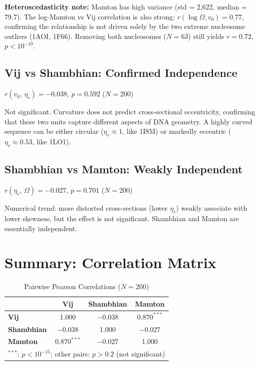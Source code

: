 \textbf{Heteroscedasticity note:} Mamton has high variance (std = 2,622, median = 79.7). The log-Mamton vs Vij correlation is also strong: $r(\log\Omega, v_0) = 0.77$, confirming the relationship is not driven solely by the two extreme nucleosome outliers (1AOI, 1F66). Removing both nucleosomes ($N=63$) still yields $r = 0.72$, $p < 10^{-10}$.

\subsection{Vij vs Shambhian: Confirmed Independence}

\begin{keyresult}
    $r(v_0,\,\eta_r) = -0.038$, \quad $p = 0.592$ \quad ($N=200$)
\end{keyresult}

Not significant. Curvature does not predict cross-sectional eccentricity, confirming that these two units capture different aspects of DNA geometry. A highly curved sequence can be either circular ($\eta_r \approx 1$, like 1I8M) or markedly eccentric ($\eta_r \approx 0.53$, like 1LO1).

\subsection{Shambhian vs Mamton: Weakly Independent}

\begin{keyresult}
    $r(\eta_r,\,\Omega) = -0.027$, \quad $p = 0.701$ \quad ($N=200$)
\end{keyresult}

Numerical trend: more distorted cross-sections (lower $\eta_r$) weakly associate with lower skewness, but the effect is not significant. Shambhian and Mamton are essentially independent.

\section{Summary: Correlation Matrix}

\begin{table}[h]
    \centering
    \caption{Pairwise Pearson Correlations ($N=200$)}
    \begin{tabular}{lccc}
        \toprule
         & \textbf{Vij} & \textbf{Shambhian} & \textbf{Mamton} \\
        \midrule
        \textbf{Vij}       & 1.000   & $-0.038$               & $\mathbf{0.870}^{***}$  \\
        \textbf{Shambhian} & $-0.038$ & 1.000                  & $-0.027$               \\
        \textbf{Mamton}    & $0.870^{***}$ & $-0.027$          & 1.000                  \\
        \bottomrule
        \multicolumn{4}{l}{\small $^{***}$: $p < 10^{-15}$; other pairs: $p > 0.2$ (not significant)}
    \end{tabular}
\end{table}

